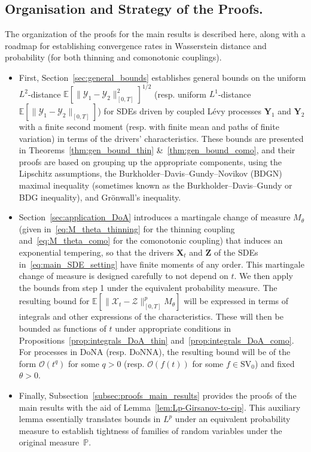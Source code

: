 \documentclass[en,oneside,bbfont,article]{amsart}
\theoremstyle{remark}
\theoremstyle{definition}
\theoremstyle{definition}
\newcommand\X{\bm{\mathcal{X}}}
\newcommand\Y{\bm{\mathcal{Y}}}
\newcommand\ZZ{\bm{\mathcal{Z}}}
\newcommand\E{\mathds{E}}
\newcommand\p{\mathds{P}}
\newcommand\1{\mathds{1}}
\newcommand\Oh{\mathcal{O}}
\newcommand\SV{\mathrm{SV}}
\begin{document}
\subsection{Organisation and Strategy of the Proofs.} 
\label{subsec:outline}
The organization of the proofs for the main results is described here, along with a roadmap for establishing convergence rates in Wasserstein distance and probability (for both thinning and comonotonic couplings).
\begin{itemize}[leftmargin=1.5em, nosep]
\item[\textbf{1.}] First, Section~\ref{sec:general_bounds} establishes general bounds on the uniform $L^2$-distance $\E[\|\Y_1-\Y_2\|_{[0,T]}^2]^{1/2}$ (resp. uniform $L^1$-distance $\E[\|\Y_1-\Y_2\|_{[0,T]}]$) for SDEs driven by coupled L\'evy processes $\bm{Y}_1$ and $\bm{Y}_2$ with a finite second moment (resp. with finite mean and paths of finite variation) in terms of the drivers' characteristics. These bounds are presented in Theorems~\ref{thm:gen_bound_thin} \&~\ref{thm:gen_bound_como}, and their proofs are based on grouping up the appropriate components, using the Lipschitz assumptions, the Burkholder--Davis--Gundy--Novikov (BDGN) maximal inequality (sometimes known as the Burkholder--Davis--Gundy or BDG inequality), and Gr\"onwall's inequality. 
\item[\textbf{2.}] Section~\ref{sec:application_DoA} introduces a martingale change of measure $M_\theta$ (given in~\eqref{eq:M_theta_thinning} for the thinning coupling and~\eqref{eq:M_theta_como} for the comonotonic coupling) that induces an exponential tempering, so that the drivers $\bm{X}_t$ and $\bm{Z}$ of the SDEs in~\eqref{eq:main_SDE_setting} have finite moments of any order. This martingale change of measure is designed carefully to not depend on $t$. We then apply the bounds from step 1 under the equivalent probability measure. The resulting bound for $\E[\|\X_t-\ZZ\|_{[0,T]}^pM_\theta]$ will be expressed in terms of integrals and other expressions of the characteristics. These will then be bounded as functions of $t$ under appropriate conditions in Propositions~\ref{prop:integrals_DoA_thin} and~\ref{prop:integrals_DoA_como}. For processes in DoNA (resp. DoNNA), the resulting bound will be of the form $\Oh(t^q)$ for some $q>0$ (resp. $\Oh(f(t))$ for some $f \in \SV_0$) and fixed $\theta>0$. 
\item[\textbf{3.}] Finally, Subsection~\ref{subsec:proofs_main_results} provides the proofs of the main results with the aid of Lemma~\ref{lem:Lp-Girsanov-to-cip}. This auxiliary lemma essentially translates bounds in $L^p$ under an equivalent probability measure to establish tightness of families of random variables under the original measure~$\p$.
\end{itemize}
\end{document}
